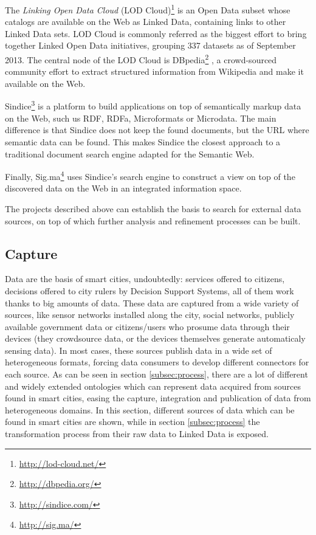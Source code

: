 The \textit{Linking Open Data Cloud} (LOD Cloud)\footnote{\url{http://lod-cloud.net/}} is an Open Data subset whose catalogs are available on the Web as Linked Data, containing links to other Linked Data sets. LOD Cloud is commonly referred as the biggest effort to bring together Linked Open Data initiatives, grouping 337 datasets as of September 2013. The central node of the LOD Cloud is DBpedia\footnote{\url{http://dbpedia.org/}} \cite{auer2007dbpedia,bizer2009dbpedia}, a crowd-sourced community effort to extract structured information from Wikipedia and make it available on the Web.

Sindice\footnote{\url{http://sindice.com/}} \cite{tummarello2007sindice} is a platform to build applications on top of semantically markup data on the Web, such us RDF, RDFa, Microformats or Microdata. The main difference is that Sindice does not keep the found documents, but the URL where semantic data can be found. This makes Sindice the closest approach to a traditional document search engine adapted for the Semantic Web.

Finally, Sig.ma\footnote{\url{http://sig.ma/}} \cite{tummarello2010sig} uses Sindice's search engine to construct a view on top of the discovered data on the Web in an integrated information space.

The projects described above can establish the basis to search for external data sources, on top of which further analysis and refinement processes can be built.

\subsection{Capture}
\label{sec:capture}

Data are the basis of smart cities, undoubtedly: services offered to citizens, decisions offered to city rulers by Decision Support Systems, all of them work thanks to big amounts of data. These data are captured from a wide variety of sources, like sensor networks installed along the city, social networks, publicly available government data or citizens/users who prosume data through their devices (they crowdsource data, or the devices themselves generate automaticaly sensing data). In most cases, these sources publish data in a wide set of heterogeneous formats, forcing data consumers to develop different connectors for each source. As can be seen in section \ref{subsec:process}, there are a lot of different and widely extended ontologies which can represent data acquired from sources found in smart cities, easing the capture, integration and publication of data from heterogeneous domains. In this section, different sources of data which can be found in smart cities are shown, while in section \ref{subsec:process} the transformation process from their raw data to Linked Data is exposed.

